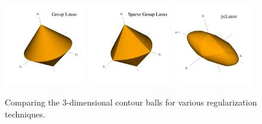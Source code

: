 \documentclass[10pt]{article}
\begin{document}
\begin{figure}
    \includegraphics[width = 0.32\textwidth]{3D_glasso_contour.png}
    \includegraphics[width = 0.32\textwidth]{3D_sglasso_contour.png} \hspace{0.2cm}
    \includegraphics[width = 0.32\textwidth]{3D_pclasso_contour3.png}
    \caption{Comparing the 3-dimensional contour balls for various regularization techniques.}
    \label{groupcontours}
\end{figure}

\end{document}

